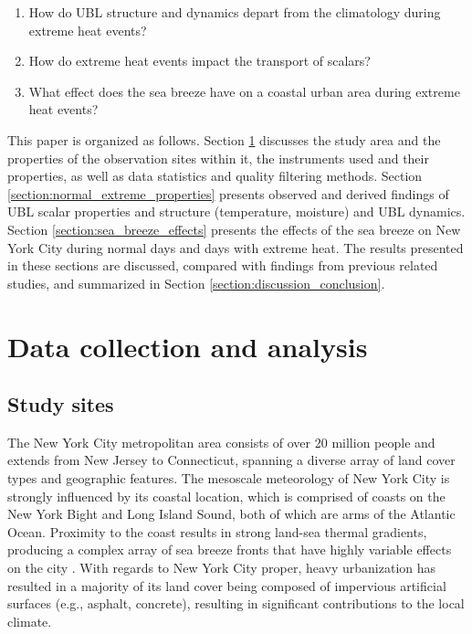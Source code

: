 \documentclass[11pt,a4paper]{article}
\begin{document}
\begin{enumerate}
  \item How do UBL structure and dynamics depart from the climatology during extreme heat events?
  \item How do extreme heat events impact the transport of scalars?
  \item What effect does the sea breeze have on a coastal urban area during extreme heat events?
\end{enumerate}

This paper is organized as follows. Section \ref{section:data_methods} discusses the study area and the properties of the observation sites within it, the instruments used and their properties, as well as data statistics and quality filtering methods. Section \ref{section:normal_extreme_properties} presents observed and derived findings of UBL scalar properties and structure (temperature, moisture) and UBL dynamics. Section \ref{section:sea_breeze_effects} presents the effects of the sea breeze on New York City during normal days and days with extreme heat. The results presented in these sections are discussed, compared with findings from previous related studies, and summarized in Section \ref{section:discussion_conclusion}.


\section{Data collection and analysis} \label{section:data_methods}

\subsection{Study sites} 

The New York City metropolitan area consists of over 20 million people \citep{bureau2021} and extends from New Jersey to Connecticut, spanning a diverse array of land cover types and geographic features. The mesoscale meteorology of New York City is strongly influenced by its coastal location, which is comprised of coasts on the New York Bight and Long Island Sound, both of which are arms of the Atlantic Ocean. Proximity to the coast results in strong land-sea thermal gradients, producing a complex array of sea breeze fronts that have highly variable effects on the city \citep{bornstein1981, gedzelman2003}. With regards to New York City proper, heavy urbanization has resulted in a majority of its land cover being composed of impervious artificial surfaces (e.g., asphalt, concrete), resulting in significant contributions to the local climate.
\end{document}
